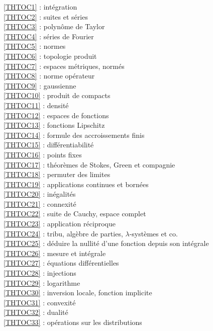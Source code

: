 \ref {THTOC1} : intégration\\
\ref {THTOC2} : suites et séries\\
\ref {THTOC3} : polynôme de Taylor\\
\ref {THTOC4} : séries de Fourier\\
\ref {THTOC5} : normes\\
\ref {THTOC6} : topologie produit\\
\ref {THTOC7} : espaces métriques, normés\\
\ref {THTOC8} : norme opérateur\\
\ref {THTOC9} : gaussienne\\
\ref {THTOC10} : produit de compacts\\
\ref {THTOC11} : densité\\
\ref {THTOC12} : espaces de fonctions\\
\ref {THTOC13} : fonctions Lipschitz\\
\ref {THTOC14} : formule des accroissements finis\\
\ref {THTOC15} : différentiabilité\\
\ref {THTOC16} : points fixes\\
\ref {THTOC17} : théorèmes de Stokes, Green et compagnie\\
\ref {THTOC18} : permuter des limites\\
\ref {THTOC19} : applications continues et bornées\\
\ref {THTOC20} : inégalités\\
\ref {THTOC21} : connexité\\
\ref {THTOC22} : suite de Cauchy, espace complet\\
\ref {THTOC23} : application réciproque\\
\ref {THTOC24} : tribu, algèbre de parties, \( \lambda \)-systèmes et co.\\
\ref {THTOC25} : déduire la nullité d'une fonction depuis son intégrale\\
\ref {THTOC26} : mesure et intégrale\\
\ref {THTOC27} : équations différentielles\\
\ref {THTOC28} : injections\\
\ref {THTOC29} : logarithme\\
\ref {THTOC30} : inversion locale, fonction implicite\\
\ref {THTOC31} : convexité\\
\ref {THTOC32} : dualité\\
\ref {THTOC33} : opérations sur les distributions\\

